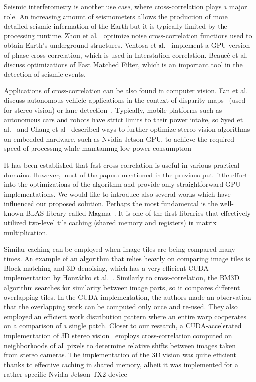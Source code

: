 Seismic interferometry is another use case, where cross-correlation plays a major role. An increasing amount of seismometers allows the production of more detailed seismic information of the Earth but it is typically limited by the processing runtime. Zhou et al.~\cite{zhou2021high} optimize noise cross-correlation functions used to obtain Earth's underground structures. Ventosa et al.~\cite{ventosa2019towards} implement a GPU version of phase cross-correlation, which is used in Interstation correlation. Beaucé et al.~\cite{beauce2017fast} discuss optimizations of Fast Matched Filter, which is an important tool in the detection of seismic events.

Applications of cross-correlation can be also found in computer vision. Fan et al. discuss autonomous vehicle applications in the context of disparity maps~\cite{fan2017real} (used for stereo vision) or lane detection~\cite{fan2018real}. Typically, mobile platforms such as autonomous cars and robots have strict limits to their power intake, so Syed et al.~\cite{syed2021accelerated} and Chang et al~\cite{chang2022efficient} described ways to further optimize stereo vision algorithms on embedded hardware, such as Nvidia Jetson GPU, to achieve the required speed of processing while maintaining low power consumption.

It has been established that fast cross-correlation is useful in various practical domains. However, most of the papers mentioned in the previous put little effort into the optimizations of the algorithm and provide only straightforward GPU implementations. We would like to introduce also several works which have influenced our proposed solution. Perhaps the most fundamental is the well-known BLAS library called Magma~\cite{tomov2011magma}. It is one of the first libraries that effectively utilized two-level tile caching (shared memory and registers) in matrix multiplication.

Similar caching can be employed when image tiles are being compared many times. An example of an algorithm that relies heavily on comparing image tiles is Block-matching and 3D denoising, which has a very efficient CUDA implementation by Honzátko et al.~\cite{paper:krulis_3d_block}. Similarly to cross-correlation, the BM3D algorithm searches for similarity between image parts, so it compares different overlapping tiles. In the CUDA implementation, the authors made an observation that the overlapping work can be computed only once and re-used. They also employed an efficient work distribution pattern where an entire warp cooperates on a comparison of a single patch. Closer to our research, a CUDA-accelerated implementation of 3D stereo vision~\cite{Cui2019Real} employs cross-correlation computed on neighborhoods of all pixels to determine relative shifts between images taken from stereo cameras. The implementation of the 3D vision was quite efficient thanks to effective caching in shared memory, albeit it was implemented for a rather specific Nvidia Jetson TX2 device.

